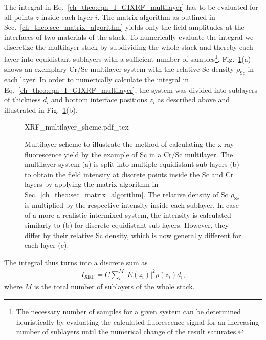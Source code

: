 The integral in Eq.~\eqref{ch_theo:eqn_I_GIXRF_multilayer} has to be evaluated for all points $z$ inside each layer $i$. The matrix algorithm as outlined in Sec.~\ref{ch_theo:sec_matrix_algorithm} yields only the field amplitudes at the interfaces of two materials of the stack. To numerically evaluate the integral we discretize the multilayer stack by subdividing the whole stack and thereby each layer into equidistant sublayers with a sufficient number of samples\footnote{The necessary number of samples for a given system can be determined heuristically by evaluating the calculated fluorescence signal for an increasing number of sublayers until the numerical change of the result saturates.}. Fig.~\ref{ch_theo:fig_xrf_multilayer_scheme}(a) shows an exemplary Cr/Sc multilayer system with the relative Sc density $\rho_\text{Sc}$ in each layer. In order to numerically calculate the integral in Eq.~\eqref{ch_theo:eqn_I_GIXRF_multilayer}, the system was divided into sublayers of thickness $d_i$ and bottom interface positions $z_i$ as described above and illustrated in Fig.~\ref{ch_theo:fig_xrf_multilayer_scheme}(b).
\begin{figure}[htb]
    \def\svgwidth{\textwidth}
    {XRF_multilayer_sheme.pdf_tex}
    \caption[Calculation scheme for the x-ray fluorescence]{Multilayer scheme to illustrate the method of calculating the x-ray fluorescence yield by the example of Sc in a Cr/Sc multilayer. The multilayer system (a) is split into multiple equidistant sub-layers (b) to obtain the field intensity at discrete points inside the Sc and Cr layers by applying the matrix algorithm in Sec.~\ref{ch_theo:sec_matrix_algorithm}. The relative density of Sc $\rho_\text{Sc}$ is multiplied by the respective intensity inside each sublayer. In case of a more a realistic intermixed system, the intensity is calculated similarly to (b) for discrete equidistant sub-layers. However, they differ by their relative Sc density, which is now generally different for each layer (c).}
    \label{ch_theo:fig_xrf_multilayer_scheme}
\end{figure}
The integral thus turns into a discrete sum as
\begin{align}
I_\text{XRF} = \tilde{C} \sum \limits_i^{M} | E(z_i) |^2 \rho(z_i) d_i \text{,} \label{ch_theo:eqn_I_GIXRF_multilayer_discrete}
\end{align}
where $M$ is the total number of sublayers of the whole stack.

